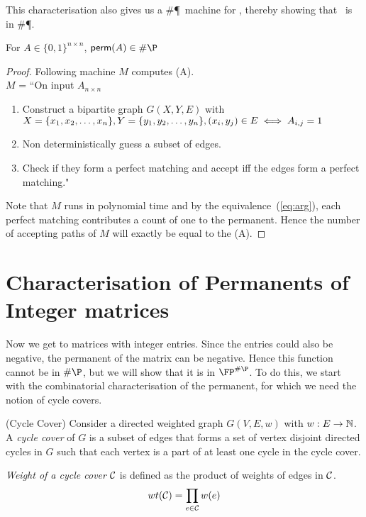This characterisation also gives us a \#\P~machine for \perm, thereby showing 
that \perm~is in \#\P.
\begin{lemma}
For $A \in \{0,1\}^{n \times n}$, $\perm(A) \in \#\P$
\end{lemma}
\begin{proof}
Following machine $M$ computes \perm(A).\\
$M$ = ``On input $A_{n\times n}$ 
\begin{enumerate}
\item Construct a bipartite graph $G(X, Y, E)$ with  
$X=\{x_1,x_2,\ldots,x_n\}, \\ Y=\{y_1,y_2,\ldots,y_n\}, (x_i,y_j) \in 
E \iff A_{i,j}=1$
\item Non deterministically guess a subset of edges.
\item Check if they form a perfect matching and accept iff the edges form a
perfect matching."
\end{enumerate}

Note that $M$ runs in polynomial time and by the equivalence~(\ref{eq:arg}),
each perfect matching contributes a count of one to the permanent. Hence the
number of accepting paths of $M$ will exactly be equal to the \perm(A).
\end{proof}

\section{Characterisation of Permanents of Integer matrices}

Now we get to matrices with integer entries. Since the entries could also be negative, the permanent of the matrix 
can be negative. Hence this function cannot be in $\#\P$, but we will show that it is in $\FP^{\#\P}$. 
To do this, we start with the combinatorial characterisation of the permanent, for which we need the notion of cycle covers.

\begin{definition}(Cycle Cover) 
Consider a directed weighted graph $G(V,E,w)$ with $w : E
\to {\mathbb{N}}$. A \emph{cycle cover} of $G$ is a subset of edges that forms a set of vertex disjoint directed
cycles in $G$ such that each vertex is a part of at least one cycle in the cycle cover.

\emph{Weight of a cycle cover} ${\cal C}$ is defined as the product of weights of
edges in ${\cal C}$.
\[ wt({\cal C}) = \prod_{\substack{e \in {\cal C}}} w(e) \]
\end{definition}

